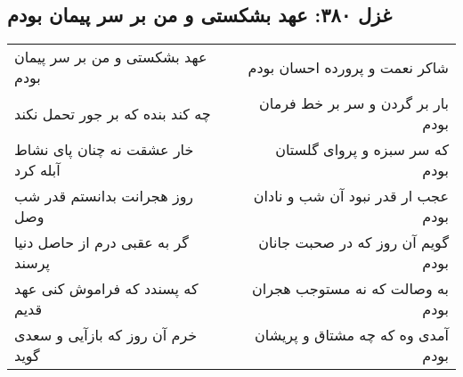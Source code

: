 \begin{center}
\section*{غزل ۳۸۰: عهد بشکستی و من بر سر پیمان بودم}
\label{sec:380}
\begin{longtable}{l p{0.5cm} r}
عهد بشکستی و من بر سر پیمان بودم
&&
شاکر نعمت و پرورده احسان بودم
\\
چه کند بنده که بر جور تحمل نکند
&&
بار بر گردن و سر بر خط فرمان بودم
\\
خار عشقت نه چنان پای نشاط آبله کرد
&&
که سر سبزه و پروای گلستان بودم
\\
روز هجرانت بدانستم قدر شب وصل
&&
عجب ار قدر نبود آن شب و نادان بودم
\\
گر به عقبی درم از حاصل دنیا پرسند
&&
گویم آن روز که در صحبت جانان بودم
\\
که پسندد که فراموش کنی عهد قدیم
&&
به وصالت که نه مستوجب هجران بودم
\\
خرم آن روز که بازآیی و سعدی گوید
&&
آمدی وه که چه مشتاق و پریشان بودم
\\
\end{longtable}
\end{center}
